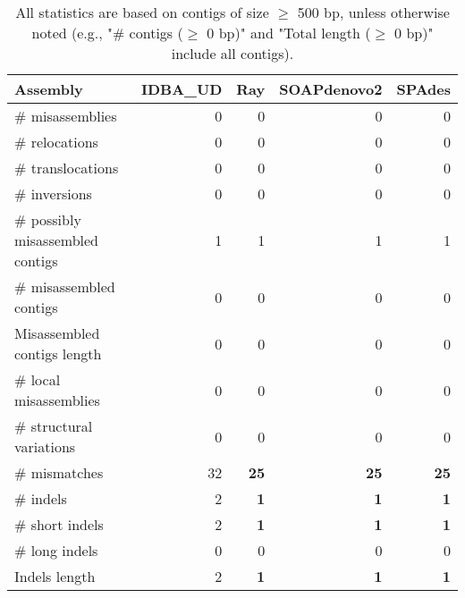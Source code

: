 \documentclass[12pt,a4paper]{article}
\begin{document}
\begin{table}[ht]
\begin{center}
\caption{All statistics are based on contigs of size $\geq$ 500 bp, unless otherwise noted (e.g., "\# contigs ($\geq$ 0 bp)" and "Total length ($\geq$ 0 bp)" include all contigs).}
\begin{tabular}{|l*{4}{|r}|}
\hline
Assembly & IDBA\_UD & Ray & SOAPdenovo2 & SPAdes \\ \hline
\# misassemblies & 0 & 0 & 0 & 0 \\ \hline
\hspace{5mm}\# relocations & 0 & 0 & 0 & 0 \\ \hline
\hspace{5mm}\# translocations & 0 & 0 & 0 & 0 \\ \hline
\hspace{5mm}\# inversions & 0 & 0 & 0 & 0 \\ \hline
\# possibly misassembled contigs & 1 & 1 & 1 & 1 \\ \hline
\# misassembled contigs & 0 & 0 & 0 & 0 \\ \hline
Misassembled contigs length & 0 & 0 & 0 & 0 \\ \hline
\# local misassemblies & 0 & 0 & 0 & 0 \\ \hline
\# structural variations & 0 & 0 & 0 & 0 \\ \hline
\# mismatches & 32 & {\bf 25} & {\bf 25} & {\bf 25} \\ \hline
\# indels & 2 & {\bf 1} & {\bf 1} & {\bf 1} \\ \hline
\hspace{5mm}\# short indels & 2 & {\bf 1} & {\bf 1} & {\bf 1} \\ \hline
\hspace{5mm}\# long indels & 0 & 0 & 0 & 0 \\ \hline
Indels length & 2 & {\bf 1} & {\bf 1} & {\bf 1} \\ \hline
\end{tabular}
\end{center}
\end{table}
\end{document}
